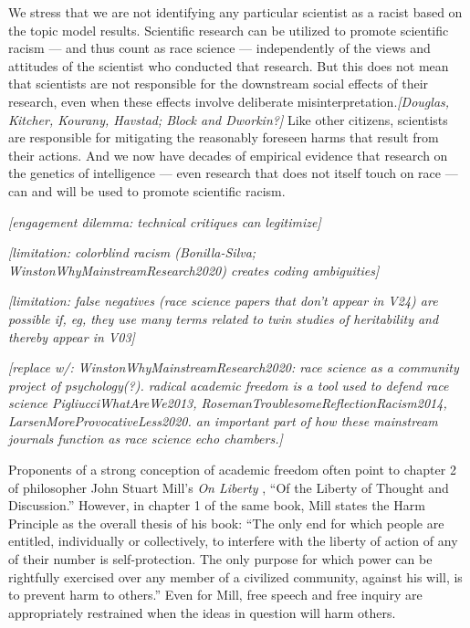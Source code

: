\documentclass[12pt]{article}
\begin{document}
We stress that we are not identifying any particular scientist as a racist based on the topic model results. Scientific research can be utilized to promote scientific racism --- and thus count as race science --- independently of the views and attitudes of the scientist who conducted that research.\cite{TaberyWhyStudyingGenetics2015, CarlsonQuantifyingContextualizingImpact2020, HennWhyDNANo2021} But this does not mean that scientists are not responsible for the downstream social effects of their
research, even when these effects involve deliberate misinterpretation.\emph{{[}Douglas, Kitcher, Kourany, Havstad; Block and Dworkin?{]}} Like other citizens, scientists are responsible for mitigating the reasonably foreseen harms that result from their actions. And we now have decades of empirical evidence that research on the genetics of intelligence --- even research that does not itself touch on race --- can and will be used to promote scientific racism.\cite{MeyerWrestlingSocialBehavioral2023}

\emph{{[}engagement dilemma: technical critiques can legitimize{]}}

\emph{{[}limitation: colorblind racism (Bonilla-Silva; WinstonWhyMainstreamResearch2020) creates coding ambiguities{]}}

\emph{{[}limitation: false negatives (race science papers that don't appear in V24) are possible if, eg, they use many terms related to twin studies of heritability and thereby appear in V03{]}}

\emph{{[}replace w/: WinstonWhyMainstreamResearch2020: race science as a community project of psychology(?). radical academic freedom is a tool used to defend race science PigliucciWhatAreWe2013, RosemanTroublesomeReflectionRacism2014, LarsenMoreProvocativeLess2020. an important part of how these mainstream journals function as race science echo chambers.{]}}

Proponents of a strong conception of academic freedom often point to chapter 2 of philosopher John Stuart Mill's \emph{On Liberty} \cite{MillLiberty1862}, ``Of the Liberty of Thought and Discussion.'' However, in chapter 1 of the same book, Mill states the Harm Principle as the overall thesis of his book: ``The only end for which people are entitled, individually or collectively, to interfere with the liberty of action of any of their number is self-protection. The only purpose for which power can be rightfully exercised over any member of a civilized community, against his will, is to prevent harm to others.'' Even for Mill, free speech and free inquiry are appropriately restrained when the ideas in question will harm others.
\end{document}
